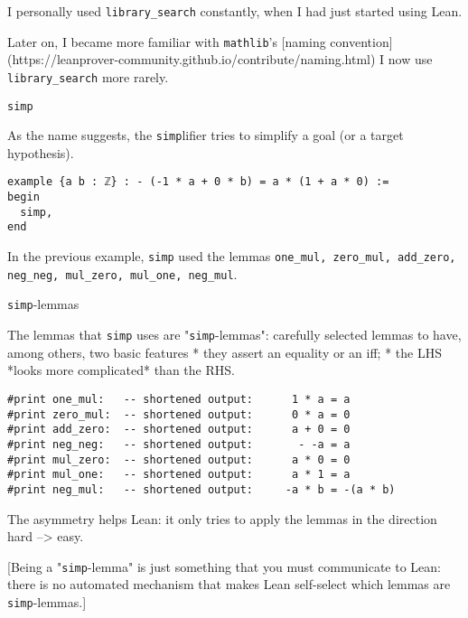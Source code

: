 \documentclass{beamer}
\begin{document}
\begin{frame}[fragile]

I personally used {\verb`library_search`} constantly, when I had just started using Lean.

Later on, I became more familiar with {\verb`mathlib`}'s [naming convention](https://leanprover-community.github.io/contribute/naming.html) I now use {\verb`library_search`} more rarely.

\end{frame}
\begin{frame}[fragile]

{{\texttt{simp}}}

As the name suggests, the {\verb`simp`}lifier tries to simplify a goal (or a target hypothesis).

\begin{verbatim}
example {a b : ℤ} : - (-1 * a + 0 * b) = a * (1 + a * 0) :=
begin
  simp,
end
\end{verbatim}
In the previous example, {\verb`simp`} used the lemmas {\verb`one_mul, zero_mul, add_zero, neg_neg, mul_zero, mul_one, neg_mul`}.

\end{frame}
\begin{frame}[fragile]

{{\texttt{simp}}-lemmas}

The lemmas that {\verb`simp`} uses are "{\verb`simp`}-lemmas": carefully selected lemmas to have, among others, two basic features
* they assert an equality or an iff;
* the LHS *looks more complicated* than the RHS.

\begin{verbatim}
#print one_mul:   -- shortened output:      1 * a = a
#print zero_mul:  -- shortened output:      0 * a = 0
#print add_zero:  -- shortened output:      a + 0 = 0
#print neg_neg:   -- shortened output:       - -a = a
#print mul_zero:  -- shortened output:      a * 0 = 0
#print mul_one:   -- shortened output:      a * 1 = a
#print neg_mul:   -- shortened output:     -a * b = -(a * b)
\end{verbatim}

The asymmetry helps Lean: it only tries to apply the lemmas in the direction hard --> easy.

[Being a "{\verb`simp`}-lemma" is just something that you must communicate to Lean: there is no automated mechanism that makes Lean self-select which lemmas are {\verb`simp`}-lemmas.]
\end{frame}
\end{document}
